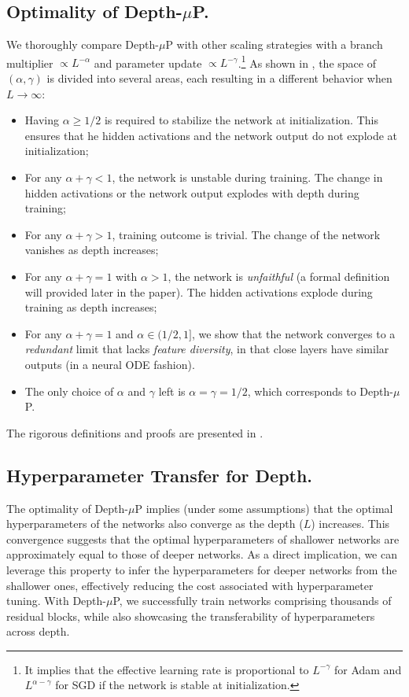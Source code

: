 \subsection{Optimality of Depth-$\mu$P. } 

We thoroughly compare Depth-$\mu$P with other scaling strategies with a branch multiplier $\propto L^{-\alpha}$ and parameter update  $\propto L^{-\gamma}$.\footnote{It implies that the effective learning rate is proportional to $L^{-\gamma}$ for Adam and $L^{\alpha-\gamma}$ for SGD if the network is stable at initialization.}  As shown in , the space of $(\alpha, \gamma)$ is divided into several areas, each resulting in a different behavior when $L\to \infty$: 
\begin{itemize}[leftmargin=*]
    \item Having $\alpha\geq 1/2$ is required to stabilize the network at initialization. This ensures that he hidden activations and the network output do not explode at initialization;
    \item For any $\alpha+\gamma < 1$, the network is unstable during training. The change in hidden activations or the network output explodes with depth during training;
    \item For any $\alpha+\gamma > 1$, training outcome is trivial. The change of the network vanishes as depth increases;
\end{itemize}

\begin{itemize}[leftmargin=*]
    \item For any $\alpha+\gamma=1$ with $\alpha > 1$, the network is \emph{unfaithful} (a formal definition will provided later in the paper). The hidden activations explode during training as depth increases;
    \item For any $\alpha + \gamma = 1$ and $\alpha \in (1/2, 1]$, we show that the network converges to a \emph{redundant} limit that lacks \emph{feature diversity}, in that close layers have similar outputs (in a neural ODE fashion). 
    \item The only choice of $\alpha$ and $\gamma$ left is $\alpha = \gamma = 1/2$, which corresponds to Depth-$\mu$P.
\end{itemize}
The rigorous definitions and proofs are presented in . 

\subsection{Hyperparameter Transfer for Depth.} 
The optimality of Depth-$\mu$P implies (under some assumptions) that the optimal hyperparameters of the networks also converge as the depth ($L$) increases.
This convergence suggests that the optimal hyperparameters of shallower networks are approximately equal to those of deeper networks. As a direct implication, we can leverage this property to infer the hyperparameters for deeper networks from the shallower ones, effectively reducing the cost associated with hyperparameter tuning. With Depth-$\mu$P, we successfully train networks comprising thousands of residual blocks, while also showcasing the transferability of hyperparameters across depth.


